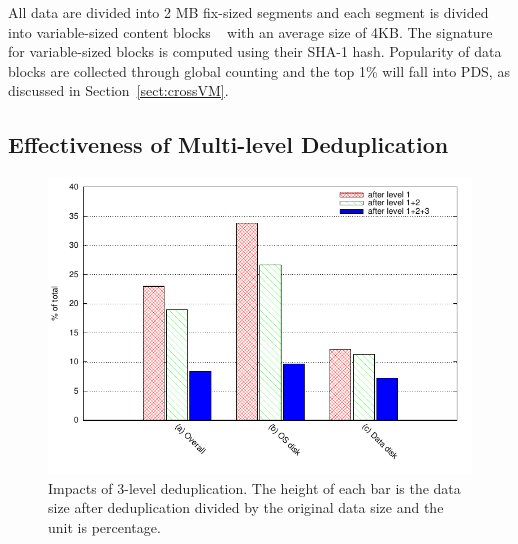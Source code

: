 All data are divided into 2 MB fix-sized segments and each segment is divided into
variable-sized content blocks ~\cite{similar94,rabin81} with an average size of 4KB.
The signature for variable-sized blocks is computed using their SHA-1 hash.
Popularity of data blocks are collected through global counting
and the top 1\% will fall into PDS, as discussed in Section~\ref{sect:crossVM}.



\subsection{Effectiveness of Multi-level Deduplication}

\begin{figure}
  \centering
  \includegraphics[width=5in]{images/overall_effect.pdf}
  \caption{Impacts of 3-level deduplication. The height of each bar is the data size after
deduplication divided by the original data size and the unit is percentage. }
  \label{fig:overall}
\end{figure}

